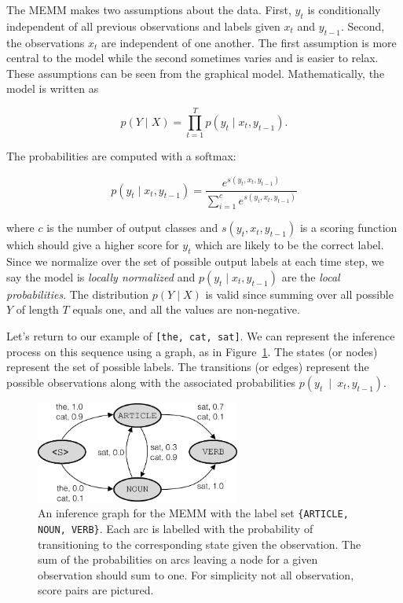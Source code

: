 \documentclass[11pt, letterpaper]{article}
\begin{document}
The MEMM makes two assumptions about the data. First, $y_t$ is conditionally
independent of all previous observations and labels given $x_t$ and $y_{t-1}$.
Second, the observations $x_t$ are independent of one another. The first
assumption is more central to the model while the second sometimes varies and
is easier to relax. These assumptions can be seen from the graphical model.
Mathematically, the model is written as

\begin{equation}
 p(Y \mid X) = \prod_{t=1}^T p(y_t \mid x_t, y_{t-1}).
\end{equation}

The probabilities are computed with a softmax:

\begin{equation}
 p(y_t \mid x_t, y_{t-1}) = \frac{e^{s(y_t, x_t, y_{t-1})}}{\sum_{i=1}^c e^{s(y_i, x_t, y_{t-1})}}
\end{equation}

where $c$ is the number of output classes and $s(y_t, x_t, y_{t-1})$ is a
scoring function which should give a higher score for $y_t$ which are likely to
be the correct label. Since we normalize over the set of possible output labels
at each time step, we say the model is \emph{locally normalized} and $p(y_t \mid
x_t, y_{t-1})$ are the \emph{local probabilities}. The distribution $p(Y \mid X)$ is
valid since summing over all possible $Y$ of length $T$ equals one, and all
the values are non-negative.

Let's return to our example of \texttt{[the, cat, sat]}. We can represent the
inference process on this sequence using a graph, as in
Figure~\ref{fig:memm_inf_norm}. The states (or nodes) represent the set of
possible labels. The transitions (or edges) represent the possible observations
along with the associated probabilities $p(y_t~\!\mid~\!x_t, y_{t-1})$.

\begin{figure}
    \centering
    \includegraphics[width=0.6\textwidth]{figures/memm_inference_normalized.pdf}
    \caption{An inference graph for the MEMM with the label set
    \texttt{\{ARTICLE, NOUN, VERB\}}.  Each arc is labelled with the
    probability of transitioning to the corresponding state given the
    observation. The sum of the probabilities on arcs leaving a node for a
    given observation should sum to one. For simplicity not all observation,
    score pairs are pictured.}
    \label{fig:memm_inf_norm}
\end{figure}
\end{document}
